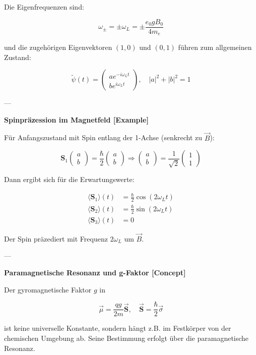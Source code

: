 \documentclass[10pt, letterpaper]{article}
\begin{document}
Die Eigenfrequenzen sind:

\[
\omega_{\pm} = \pm \omega_L = \pm \frac{e_0 g B_0}{4 m_e}
\]

und die zugehörigen Eigenvektoren \( (1,0) \) und \( (0,1) \) führen zum allgemeinen Zustand:

\[
\tilde{\psi}(t) = \begin{pmatrix} a e^{-i \omega_L t} \\ b e^{i \omega_L t} \end{pmatrix},
\quad |a|^2 + |b|^2 = 1
\]

---

\textbf{Spinpräzession im Magnetfeld [Example]}

Für Anfangszustand mit Spin entlang der 1-Achse (senkrecht zu \( \vec{B} \)):

\[
\mathbf{S}_1 \begin{pmatrix} a \\ b \end{pmatrix} = \frac{\hbar}{2} \begin{pmatrix} a \\ b \end{pmatrix}
\Rightarrow \begin{pmatrix} a \\ b \end{pmatrix} = \frac{1}{\sqrt{2}} \begin{pmatrix} 1 \\ 1 \end{pmatrix}
\]

Dann ergibt sich für die Erwartungswerte:

\[
\begin{aligned}
\langle \mathbf{S}_1 \rangle(t) &= \frac{\hbar}{2} \cos (2 \omega_L t) \\
\langle \mathbf{S}_2 \rangle(t) &= \frac{\hbar}{2} \sin (2 \omega_L t) \\
\langle \mathbf{S}_3 \rangle(t) &= 0
\end{aligned}
\]

Der Spin präzediert mit Frequenz \( 2\omega_L \) um \( \vec{B} \).

---

\textbf{Paramagnetische Resonanz und g-Faktor [Concept]}

Der gyromagnetische Faktor \( g \) in

\[
\vec{\mu} = \frac{q g}{2m} \vec{\mathbf{S}}, \quad \vec{\mathbf{S}} = \frac{\hbar}{2} \vec{\sigma}
\]

ist keine universelle Konstante, sondern hängt z.B. im Festkörper von der chemischen Umgebung ab. Seine Bestimmung erfolgt über die paramagnetische Resonanz.
\end{document}
